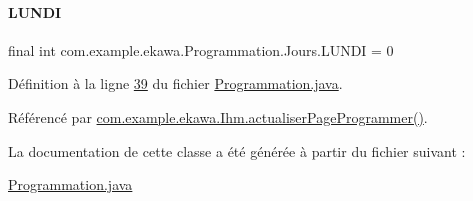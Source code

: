 \paragraph{\texorpdfstring{L\+U\+N\+DI}{LUNDI}}
{\footnotesize\ttfamily final int com.\+example.\+ekawa.\+Programmation.\+Jours.\+L\+U\+N\+DI = 0\hspace{0.3cm}{\ttfamily [static]}}



Définition à la ligne \hyperlink{_programmation_8java_source_l00039}{39} du fichier \hyperlink{_programmation_8java_source}{Programmation.\+java}.



Référencé par \hyperlink{_ihm_8java_source_l00938}{com.\+example.\+ekawa.\+Ihm.\+actualiser\+Page\+Programmer()}.



La documentation de cette classe a été générée à partir du fichier suivant \+:\begin{DoxyCompactItemize}
\item 
\hyperlink{_programmation_8java}{Programmation.\+java}\end{DoxyCompactItemize}
